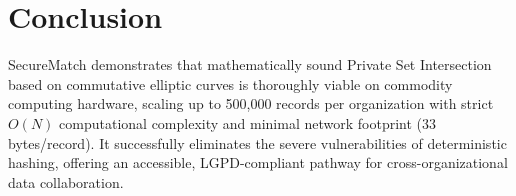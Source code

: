 \documentclass[10pt,a4paper]{article}
\begin{document}
\section{Conclusion}
SecureMatch demonstrates that mathematically sound Private Set Intersection based on commutative elliptic curves is thoroughly viable on commodity computing hardware, scaling up to 500,000 records per organization with strict $O(N)$ computational complexity and minimal network footprint ($33$ bytes/record). It successfully eliminates the severe vulnerabilities of deterministic hashing, offering an accessible, LGPD-compliant pathway for cross-organizational data collaboration.
\end{document}
